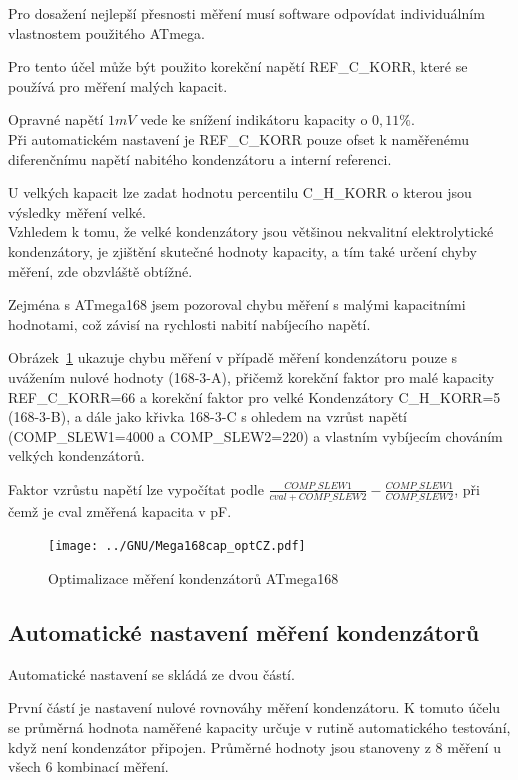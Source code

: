 Pro dosažení nejlepší přesnosti měření musí software odpovídat individuálním vlastnostem použitého ATmega.

Pro tento účel může být použito korekční napětí REF\_C\_KORR, které se používá pro měření malých kapacit.

Opravné napětí \(1mV\) vede ke snížení indikátoru kapacity o \(0,11\%\).\\
Při automatickém nastavení je REF\_C\_KORR pouze ofset k naměřenému diferenčnímu napětí nabitého kondenzátoru
a interní referenci.

U velkých kapacit lze zadat hodnotu percentilu C\_H\_KORR o kterou jsou výsledky měření velké.\\
Vzhledem k tomu, že velké kondenzátory jsou většinou nekvalitní elektrolytické kondenzátory, je zjištění
skutečné hodnoty kapacity, a tím také určení chyby měření, zde obzvláště obtížné.

Zejména s ATmega168 jsem pozoroval chybu měření s malými kapacitními hodnotami,
což závisí na rychlosti nabití nabíjecího napětí.

Obrázek~\ref{fig:mega168optcap}  ukazuje chybu měření v případě měření kondenzátoru pouze s uvážením
nulové hodnoty (168-3-A), přičemž korekční faktor pro malé kapacity REF\_C\_KORR=66 a korekční faktor pro velké
Kondenzátory C\_H\_KORR=5 (168-3-B), a dále jako křivka 168-3-C s ohledem na vzrůst napětí (COMP\_SLEW1=4000 a COMP\_SLEW2=220) a vlastním vybíjecím chováním velkých kondenzátorů.

Faktor vzrůstu napětí lze vypočítat podle \(\frac{COMP\_SLEW1}{cval+COMP\_SLEW2} - \frac{COMP\_SLEW1}{COMP\_SLEW2}\), při čemž je cval změřená kapacita v pF.

\begin{figure}[H]
\centering
\texttt{[image: ../GNU/Mega168cap\_optCZ.pdf]}
\caption{Optimalizace měření kondenzátorů ATmega168}
\label{fig:mega168optcap}
\end{figure}

\subsection{Automatické nastavení měření kondenzátorů}

Automatické nastavení se skládá ze dvou částí.

První částí je nastavení nulové rovnováhy měření kondenzátoru.
K tomuto účelu se průměrná hodnota naměřené kapacity určuje v rutině automatického testování, když není kondenzátor připojen.
Průměrné hodnoty jsou stanoveny z 8 měření u všech 6 kombinací měření.

